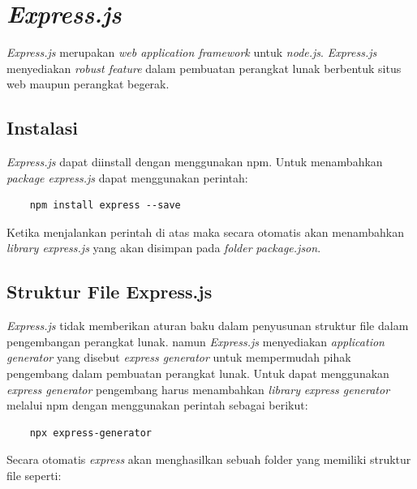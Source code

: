 \section{\textit{Express.js}}
\textit{Express.js} merupakan \textit{web application framework} untuk \textit{node.js}. \textit{Express.js} menyediakan \textit{robust feature} dalam pembuatan  perangkat lunak berbentuk situs web maupun perangkat begerak\cite{expressjs:01:about}. 

\subsection{Instalasi}
\textit{Express.js} dapat diinstall dengan menggunakan npm. Untuk menambahkan \textit{package express.js} dapat menggunakan perintah:
\begin{verbatim}
    npm install express --save
\end{verbatim}
Ketika menjalankan perintah di atas maka secara otomatis akan menambahkan \textit{library express.js} yang akan disimpan pada \textit{folder} \textit{package.json}.

\subsection{Struktur File Express.js}
\textit{Express.js} tidak memberikan aturan baku dalam penyusunan struktur file dalam pengembangan perangkat lunak. namun \textit{Express.js} menyediakan \textit{application generator} yang disebut \textit{express generator} untuk mempermudah pihak pengembang dalam pembuatan perangkat lunak\cite{expressjs:01:about}. Untuk dapat menggunakan \textit{express generator} pengembang harus menambahkan \textit{library} \textit{express generator} melalui npm dengan menggunakan perintah sebagai berikut:

\begin{verbatim}
    npx express-generator
\end{verbatim}
Secara otomatis \textit{express} akan menghasilkan sebuah folder yang memiliki struktur file seperti:
        

